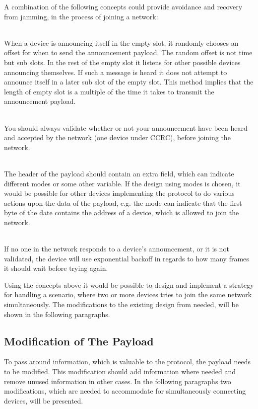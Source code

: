 A combination of the following concepts could provide avoidance and recovery from jamming, in the process of joining a network: 
\begin{description}[labelindent=\parindent]
    \item[Random Offset]\hfill\\
    When a device is announcing itself in the empty slot, it randomly chooses an offset for when to send the announcement payload.
    The random offset is not time but sub slots. 
    In the rest of the empty slot it listens for other possible devices announcing themselves.
    If such a message is heard it does not attempt to announce itself in a later sub slot of the empty slot.
    This method implies that the length of empty slot is a multiple of the time it takes to transmit the announcement payload.
    \item[Validation]\hfill\\
    You should always validate whether or not your announcement have been heard and accepted by  the network (one device under CCRC), before joining the network.
    \item[Payload Mode]\hfill\\
    The header of the payload should contain an extra field, which can indicate different modes or some other variable.
    If the design using modes is chosen, it would be possible for other devices implementing the protocol to do various actions upon the data of the payload, e.g. the mode can indicate that the first byte of the date contains the address of a device, which is allowed to join the network.
    \item[Exponential Backoff]\hfill\\ 
    If no one in the network responds to a device's announcement, or it is not validated, the device will use exponential backoff in regards to how many frames it should wait before trying again.
\end{description} 
\noindent
Using the concepts above it would be possible to design and implement a strategy for handling a scenario, where two or more devices tries to join the same network simultaneously.
The modifications to the existing design from  needed, will be shown in the following paragraphs.

\subsection{Modification of The Payload} %
\label{sub:modification_of_the_payload}
To pass around information, which is valuable to the protocol, the payload needs to be modified.
This modification should add information where needed and remove unused information in other cases.
In the following paragraphs two modifications, which are needed to accommodate for simultaneously connecting devices, will be presented. 

